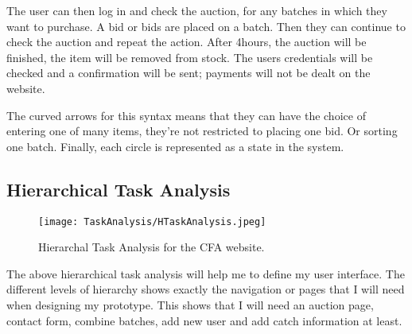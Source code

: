 \documentclass{article}
\begin{document}
The user can then log in and check the auction, for any batches in which they want to purchase. A bid or bids are placed on a batch. Then they can continue to check the auction and repeat the action. After 4hours, the auction will be finished, the item will be removed from stock. The users credentials will be checked and a confirmation will be sent; payments will not be dealt on the website.

The curved arrows for this syntax means that they can have the choice of entering one of many items, they're not restricted to placing one bid. Or sorting one batch. Finally, each circle is represented as a state in the system. 
\subsection{Hierarchical Task Analysis}

\begin{figure}[htp]
\begin{adjustwidth}{-1.5cm}{4cm}
\centering
\texttt{[image: TaskAnalysis/HTaskAnalysis.jpeg]}
\caption{Hierarchal Task Analysis for the CFA website.}
\label{}
\end{adjustwidth}
\end{figure}
The above hierarchical task analysis will help me to define my user interface. The different levels of hierarchy shows exactly the navigation or pages that I will need when designing my prototype. This shows that I will need an auction page, contact form, combine batches, add new user and add catch information at least.
\end{document}

